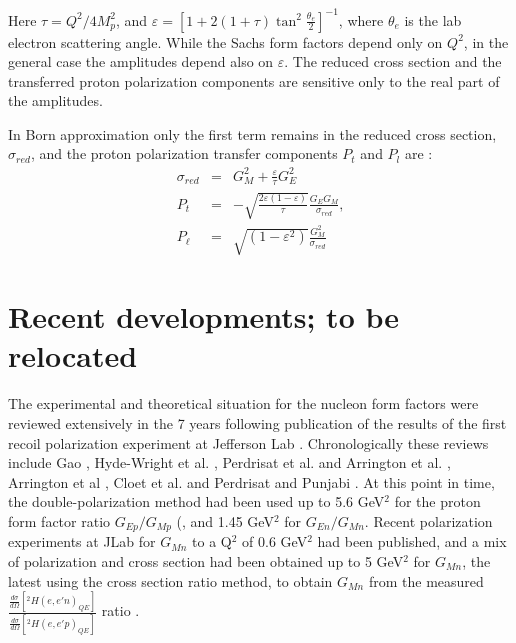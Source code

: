 Here $\tau=Q^{2}/4M_{p}^{2}$, 
and $\varepsilon =[1+2(1+\tau)\tan^2\frac{\theta_e}{2}]^{-1}$,
where  $\theta_e$ is the lab electron scattering angle.
While the Sachs form factors depend only on $Q^2$, in the general case the
amplitudes depend also on $\varepsilon$.
The  reduced cross section
and the transferred proton polarization components are sensitive only to the real part
of the amplitudes. 

In Born approximation only the first term remains in the reduced cross 
section, $\sigma _{red}$, and the
proton polarization transfer components $P_t$ and $P_l$ are :
\begin{eqnarray}
{\sigma _{red}}&=& G_M^2 + \frac{\varepsilon}{\tau }G_E^2
\label{eq:sigborn}
\\
P_t&=&-\sqrt{\frac{2\varepsilon(1-\varepsilon)}{\tau}} \frac{G_EG_M}{\sigma _{red}}
\label{eq:ptgen}
\mbox{,}  \\
P_{\ell}&=&\sqrt{(1-\varepsilon ^2)} \frac{G_M^2}{\sigma _{red}}
\label{eq:pborn}
\end{eqnarray}

\section{Recent developments; to be relocated}

The experimental and theoretical situation for the nucleon form factors were reviewed extensively in the 7 years following
publication of the results of the first recoil polarization experiment at Jefferson Lab \cite{jones}. Chronologically
these reviews include Gao \cite{gaoA,gaoB}, Hyde-Wright et al. \cite{charleskees}, Perdrisat et al. \cite{perdrisat:2006} and 
Arrington et al. \cite{arrreview}, Arrington et al \cite{arrington:2011}, Cloet et al. \cite{cloet:2008}
and Perdrisat and Punjabi \cite{scholar}. At this point in time, the double-polarization method had been used up to 5.6 GeV$^2$
for the proton form factor ratio $G_{Ep}/G_{Mp}$ (\cite{jones,punjabi05A,punjabi05B,gayou:2001}, and 1.45 GeV$^2$ for $G_{En}/G_{Mn}$. 
Recent polarization experiments at JLab for $G_{Mn}$ to a Q$^2$ of 0.6 GeV$^2$ \cite{anderson} had been published, and a 
mix of polarization and cross section had been obtained up to 5 GeV$^2$ for $G_{Mn}$, the latest  using the cross section
ratio method, to obtain $G_{Mn}$ from the measured 
${\frac{\frac{d\sigma}{d\Omega}[^2H(e,e'n)_{QE}]}{\frac{d\sigma}{d\Omega}[^2H(e,e'p)_{QE}]}}$ ratio \cite{brooksA,brooksB}.

